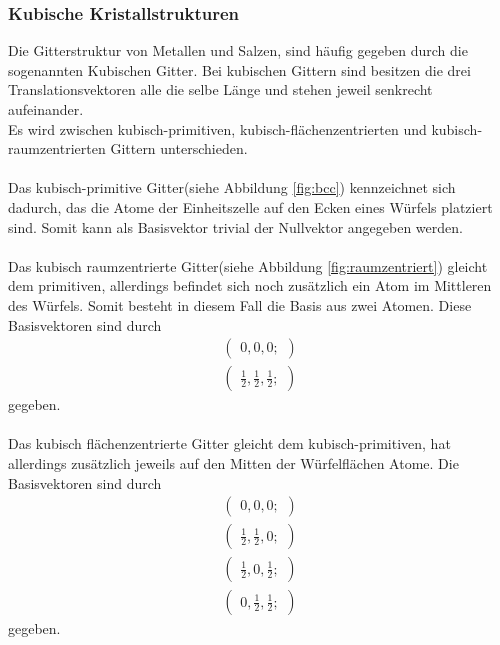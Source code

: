 \subsubsection{Kubische Kristallstrukturen}
\label{subsubsec:kubische_gitter}

Die Gitterstruktur von Metallen und Salzen, sind häufig gegeben
durch die sogenannten Kubischen Gitter.
Bei kubischen Gittern sind besitzen die drei Translationsvektoren
alle die selbe Länge und stehen jeweil senkrecht aufeinander.\\
Es wird zwischen kubisch-primitiven,
kubisch-flächenzentrierten und
kubisch-raumzentrierten Gittern unterschieden. \\ \\
Das kubisch-primitive Gitter(siehe Abbildung \ref{fig:bcc})
kennzeichnet sich dadurch,
das die Atome der Einheitszelle auf den Ecken
eines Würfels platziert sind. Somit kann als Basisvektor trivial
der Nullvektor angegeben werden.\\ \\
Das kubisch raumzentrierte Gitter(siehe Abbildung \ref{fig:raumzentriert})
gleicht dem primitiven, allerdings befindet sich noch
zusätzlich ein Atom im Mittleren des Würfels.
Somit besteht in diesem Fall die Basis aus zwei Atomen.
Diese Basisvektoren sind durch
\begin{align}
  \label{eqn:2}
  \begin{pmatrix}
    0, 0, 0;
  \end{pmatrix}\\
  \begin{pmatrix}
    \frac{1}{2}, \frac{1}{2}, \frac{1}{2};
  \end{pmatrix}
\end{align}
gegeben.\\ \\
Das kubisch flächenzentrierte Gitter gleicht dem kubisch-primitiven, hat
allerdings zusätzlich jeweils auf den Mitten der Würfelflächen Atome.
Die Basisvektoren sind durch
\begin{align}
   \label{eqn:3}
   \begin{pmatrix}
     0, 0, 0;
   \end{pmatrix}\\
   \begin{pmatrix}
     \frac{1}{2}, \frac{1}{2}, 0;
   \end{pmatrix}\\
   \begin{pmatrix}
     \frac{1}{2}, 0, \frac{1}{2};
     \end{pmatrix}\\
     \begin{pmatrix}
       0, \frac{1}{2}, \frac{1}{2};
     \end{pmatrix}
\end{align}
gegeben.

